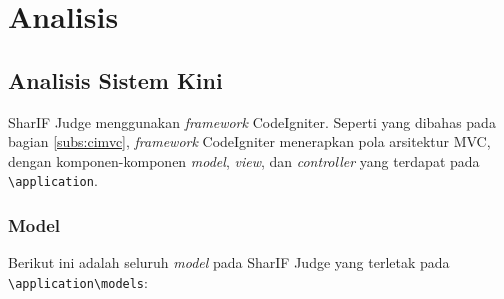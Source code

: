 \chapter{Analisis}
\label{chap:analisis}

\section{Analisis Sistem Kini}
\label{sec:analisiskini} 

SharIF Judge menggunakan \textit{framework} CodeIgniter. Seperti yang dibahas pada bagian \ref{subs:cimvc}, \textit{framework} CodeIgniter menerapkan pola arsitektur MVC, dengan komponen-komponen \textit{model}, \textit{view}, dan \textit{controller} yang terdapat pada \verb|\application|.

\subsection{Model}
\label{subs:sjmodel}

Berikut ini adalah seluruh \textit{model} pada SharIF Judge yang terletak pada \verb|\application\models|:

